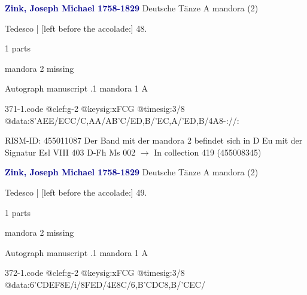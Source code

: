 \documentclass[twocolumn]{book}
\begin{document}
\newline \par \vspace{7pt} \textcolor{darkblue}{\textbf{Zink, Joseph Michael  1758-1829}}
\newline Deutsche Tänze  A  
\newline mandora (2)
\newline \begin{itshape}[f.26r, at left:] Tedesco | [left before the accolade:] 48.\end{itshape} 
\newline \textcolor{darkblue}{}  1 parts  
\newline \begin{small} mandora 2 missing\end{small} 
\newline Autograph manuscript
.1  mandora 1  A  
\begin{filecontents*}{371-1.code}
@clef:g-2
@keysig:xFCG
@timesig:3/8
@data:{8'AEE}/{ECC}/{C,AA}/{AB'C}/{ED,B}/{'EC,A}/{'ED,B}/4A8-://:
\end{filecontents*}
\newline
%

\newline RISM-ID: 455011087
\newline Der Band mit der mandora 2 befindet sich in D Eu mit der Signatur Esl VIII 403
\newline D-Fh  Ms 002
\newline $\rightarrow$ In collection 419 (455008345)

\newline \par \vspace{7pt} \textcolor{darkblue}{\textbf{Zink, Joseph Michael  1758-1829}}
\newline Deutsche Tänze  A  
\newline mandora (2)
\newline \begin{itshape}[f.26r, at left:] Tedesco | [left before the accolade:] 49.\end{itshape} 
\newline \textcolor{darkblue}{}  1 parts  
\newline \begin{small} mandora 2 missing\end{small} 
\newline Autograph manuscript
.1  mandora 1  A  
\begin{filecontents*}{372-1.code}
@clef:g-2
@keysig:xFCG
@timesig:3/8
@data:{6'CDEF}8E/i/8FED/4E8C/{6,B'CDC}8,B/'CEC/
\end{filecontents*}
\newline
%
\end{document}
